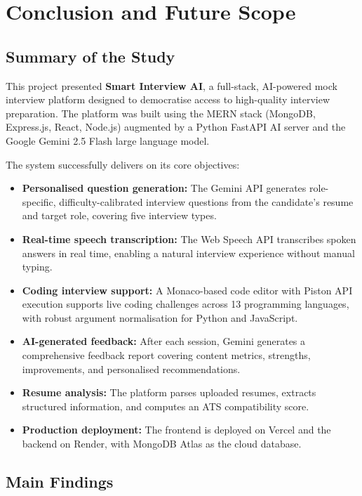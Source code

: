\chapter{Conclusion and Future Scope}

\section{Summary of the Study}

This project presented \textbf{Smart Interview AI}, a full-stack, AI-powered mock interview platform designed to democratise access to high-quality interview preparation. The platform was built using the MERN stack (MongoDB, Express.js, React, Node.js) augmented by a Python FastAPI AI server and the Google Gemini 2.5 Flash large language model.

The system successfully delivers on its core objectives:
\begin{itemize}
    \item \textbf{Personalised question generation:} The Gemini API generates role-specific, difficulty-calibrated interview questions from the candidate's resume and target role, covering five interview types.
    \item \textbf{Real-time speech transcription:} The Web Speech API transcribes spoken answers in real time, enabling a natural interview experience without manual typing.
    \item \textbf{Coding interview support:} A Monaco-based code editor with Piston API execution supports live coding challenges across 13 programming languages, with robust argument normalisation for Python and JavaScript.
    \item \textbf{AI-generated feedback:} After each session, Gemini generates a comprehensive feedback report covering content metrics, strengths, improvements, and personalised recommendations.
    \item \textbf{Resume analysis:} The platform parses uploaded resumes, extracts structured information, and computes an ATS compatibility score.
    \item \textbf{Production deployment:} The frontend is deployed on Vercel and the backend on Render, with MongoDB Atlas as the cloud database.
\end{itemize}

\section{Main Findings}

